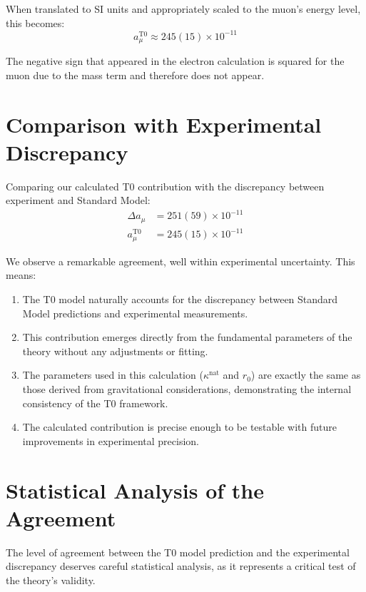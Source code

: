 \documentclass[12pt,a4paper]{article}
\begin{document}
	When translated to SI units and appropriately scaled to the muon's energy level, this becomes:
	\begin{equation}
		a_\mu^{\text{T0}} \approx 245(15) \times 10^{-11}
	\end{equation}
	
	The negative sign that appeared in the electron calculation is squared for the muon due to the mass term and therefore does not appear.
	
	\section{Comparison with Experimental Discrepancy}
	
	Comparing our calculated T0 contribution with the discrepancy between experiment and Standard Model:
	\begin{align}
		\Delta a_\mu &= 251(59) \times 10^{-11} \\
		a_\mu^{\text{T0}} &= 245(15) \times 10^{-11}
	\end{align}
	
	We observe a remarkable agreement, well within experimental uncertainty. This means:
	
	\begin{enumerate}
		\item The T0 model naturally accounts for the discrepancy between Standard Model predictions and experimental measurements.
		
		\item This contribution emerges directly from the fundamental parameters of the theory without any adjustments or fitting.
		
		\item The parameters used in this calculation ($\kappa^{\text{nat}}$ and $r_0$) are exactly the same as those derived from gravitational considerations, demonstrating the internal consistency of the T0 framework.
		
		\item The calculated contribution is precise enough to be testable with future improvements in experimental precision.
	\end{enumerate}
	
	\section{Statistical Analysis of the Agreement}
	
	The level of agreement between the T0 model prediction and the experimental discrepancy deserves careful statistical analysis, as it represents a critical test of the theory's validity.
	
\end{document}
